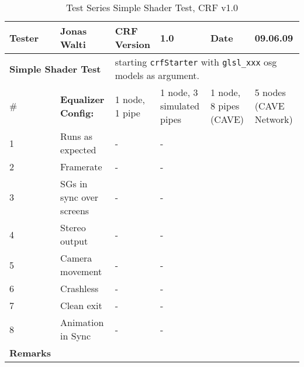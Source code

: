 \begin{table}[H]
	\centering
	\begin{tabular}{|b{}|b{}|m{}|m{}|m{}|m{}|}
		\hline
		\bfseries Tester & Jonas Walti & \bfseries CRF Version & 1.0 & \bfseries Date & 09.06.09 \\
		\hline
		\hline
		\multicolumn{2}{|l|}{\large{\bfseries Simple Shader Test}} & \multicolumn{4}{p{0.6\textwidth}|}{starting \texttt{crfStarter} with \texttt{glsl\_xxx} osg models as argument.} \\
		\hline
		\hline
		\# & \bfseries Equalizer Config: & 1 node, 1 pipe & 1 node, 3 simulated pipes &  1 node, 8 pipes (CAVE) &  5 nodes (CAVE Network) \\
		\hline 1 & Runs as expected & \quad\quad- & \quad\quad- & \tick & \tick \\
		\hline 2 & Framerate & \quad\quad- & \quad\quad- & \quad\quad140 & \quad\quad550 \\
		\hline 3 & SGs in sync over screens & \quad\quad- & \quad\quad- & \tick & \tick \\
		\hline 4 & Stereo output & \quad\quad- & \quad\quad-& \tick & \tick \\
		\hline 5 & Camera movement & \quad\quad- & \quad\quad- & \tick & \tick \\
		\hline 6 & Crashless & \quad\quad- & \quad\quad- & \tick & \tick \\
		\hline 7 & Clean exit & \quad\quad- & \quad\quad- & \tick & \tick \\
		\hline 8 & Animation in Sync & \quad\quad- & \quad\quad- & \tick & \tick \\
		\hline
		\hline \bfseries Remarks & \multicolumn{5}{p{0.85\textwidth}|}{}\\
		\hline
	\end{tabular}
	\caption{Test Series Simple Shader Test, CRF v1.0}
	\label{table:test3}
\end{table}

